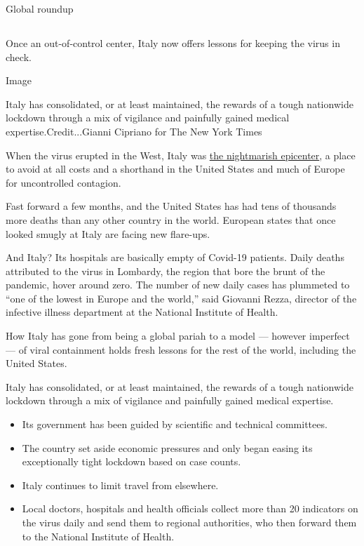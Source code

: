 Global roundup

\hypertarget{-8}{%
\subsection{}\label{-8}}

Once an out-of-control center, Italy now offers lessons for keeping the
virus in check.

Image

Italy has consolidated, or at least maintained, the rewards of a tough
nationwide lockdown through a mix of vigilance and painfully gained
medical expertise.Credit...Gianni Cipriano for The New York Times

When the virus erupted in the West, Italy was
\href{https://www.nytimes3xbfgragh.onion/interactive/2020/03/27/world/europe/coronavirus-italy-bergamo.html}{the
nightmarish epicenter}, a place to avoid at all costs and a shorthand in
the United States and much of Europe for uncontrolled contagion.

Fast forward a few months, and the United States has had tens of
thousands more deaths than any other country in the world. European
states that once looked smugly at Italy are facing new flare-ups.

And Italy? Its hospitals are basically empty of Covid-19 patients. Daily
deaths attributed to the virus in Lombardy, the region that bore the
brunt of the pandemic, hover around zero. The number of new daily cases
has plummeted to ``one of the lowest in Europe and the world,'' said
Giovanni Rezza, director of the infective illness department at the
National Institute of Health.

How Italy has gone from being a global pariah to a model --- however
imperfect --- of viral containment holds fresh lessons for the rest of
the world, including the United States.

Italy has consolidated, or at least maintained, the rewards of a tough
nationwide lockdown through a mix of vigilance and painfully gained
medical expertise.

\begin{itemize}
\item
  Its government has been guided by scientific and technical committees.
\item
  The country set aside economic pressures and only began easing its
  exceptionally tight lockdown based on case counts.
\item
  Italy continues to limit travel from elsewhere.
\item
  Local doctors, hospitals and health officials collect more than 20
  indicators on the virus daily and send them to regional authorities,
  who then forward them to the National Institute of Health.
\end{itemize}


